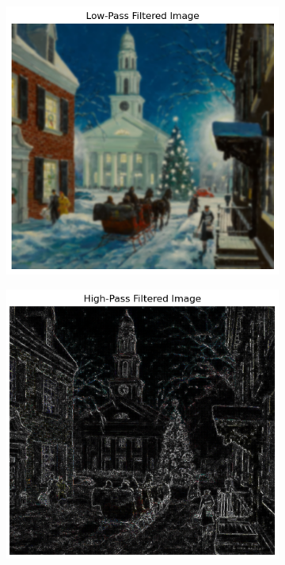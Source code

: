 \documentclass[hidelinks,12pt]{article}
\begin{document}
	
	\begin{figure}[!h]
		\centering
		\begin{subfigure}{0.45\textwidth}
			\centering
			\includegraphics[width=\linewidth]{figures/christmas_eve_lpf.png}
		\end{subfigure}
		\hfill
		\begin{subfigure}{0.45\textwidth}
			\centering
			\includegraphics[width=\linewidth]{figures/christmas_eve_hpf.png}
		\end{subfigure}
	\end{figure}
	
\end{document}
